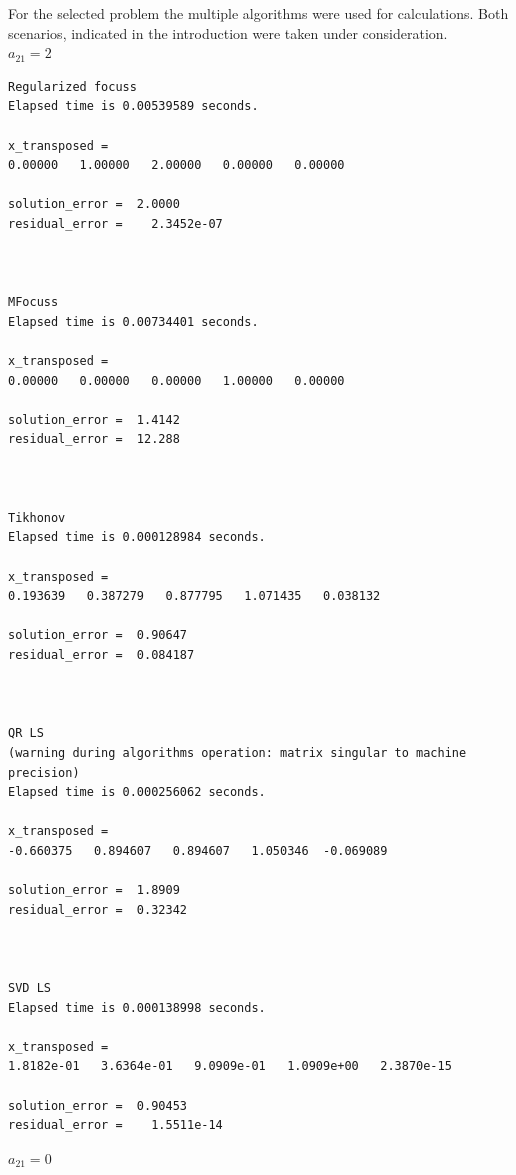 \documentclass[eng,openany]{mgr}
\begin{document}
For the selected problem the multiple algorithms were used for calculations. Both scenarios, indicated in the introduction were taken under consideration.
\\
$a_{21} = 2$
\begin{lstlisting}
Regularized focuss
Elapsed time is 0.00539589 seconds.

x_transposed =
0.00000   1.00000   2.00000   0.00000   0.00000

solution_error =  2.0000
residual_error =    2.3452e-07



MFocuss
Elapsed time is 0.00734401 seconds.

x_transposed =
0.00000   0.00000   0.00000   1.00000   0.00000

solution_error =  1.4142
residual_error =  12.288



Tikhonov
Elapsed time is 0.000128984 seconds.

x_transposed =
0.193639   0.387279   0.877795   1.071435   0.038132

solution_error =  0.90647
residual_error =  0.084187



QR LS
(warning during algorithms operation: matrix singular to machine precision)
Elapsed time is 0.000256062 seconds.

x_transposed =
-0.660375   0.894607   0.894607   1.050346  -0.069089

solution_error =  1.8909
residual_error =  0.32342



SVD LS
Elapsed time is 0.000138998 seconds.

x_transposed =
1.8182e-01   3.6364e-01   9.0909e-01   1.0909e+00   2.3870e-15

solution_error =  0.90453
residual_error =    1.5511e-14
\end{lstlisting}
\newpage
$a_{21} = 0$
\end{document}
